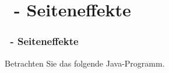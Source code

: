\def\stitle{\theexercise\ - Seiteneffekte}
\section{\stitle}
\begin{frame}[t]%
    \frametitle{\stitle}

Betrachten Sie das folgende Java-Programm.
  

\end{frame}
